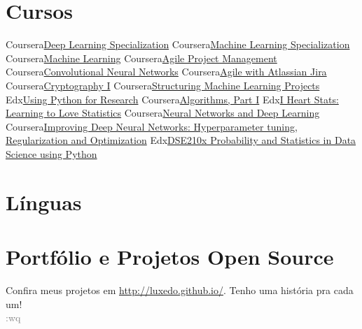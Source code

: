 \documentclass[11pt,a4paper,sans]{moderncv}        %
\begin{document}
\section{Cursos}
\cvdoubleitem
{Coursera}{\href{https://www.coursera.org/account/accomplishments/specialization/certificate/Q3RT6P3BF5XU}{Deep Learning Specialization}}
{Coursera}{\href{https://www.coursera.org/account/accomplishments/specialization/YHKBDQ77K2GB}{Machine Learning Specialization}}
\cvdoubleitem
{Coursera}{\href{https://www.coursera.org/account/accomplishments/verify/CWFKK68KQP9X}{\small{Machine Learning}}}
{Coursera}{\href{https://www.coursera.org/api/legacyCertificates.v1/spark/statementOfAccomplishment/976353~15102768/pdf}{\small{Agile Project Management}}}
\cvdoubleitem
{Coursera}{\href{https://www.coursera.org/account/accomplishments/verify/5A8K3WTQHAZF}{\small{Convolutional Neural Networks}}}
{Coursera}{\href{https://www.coursera.org/account/accomplishments/certificate/ZTZR93WKX3JV}{\small{Agile with Atlassian Jira}}}
\cvdoubleitem
{Coursera}{\href{https://www.coursera.org/api/legacyCertificates.v1/spark/statementOfAccomplishment/976353~15102768/pdf}{\small{Cryptography I}}}
{Coursera}{\href{https://www.coursera.org/account/accomplishments/verify/BBTE8KJC6WRU}{\footnotesize{Structuring Machine Learning Projects}}}
\cvdoubleitem
{Edx}{\href{https://www.edx.org/course/using-python-for-research}{\small{Using Python for Research}}}
{Coursera}{\href{https://www.coursera.org/learn/algorithms-part1}{\small{Algorithms, Part I}}}
\cvdoubleitem
{Edx}{\href{https://www.edx.org/course/i-heart-stats-learning-love-statistics-notredamex-soc120x}{\scriptsize{I Heart Stats: Learning to Love Statistics}}}
{Coursera}{\href{https://www.coursera.org/account/accomplishments/verify/RY4DLN2Q6MW3}{\footnotesize{Neural Networks and Deep Learning}}}
\cvdoubleitem
{Coursera}{\href{https://www.coursera.org/account/accomplishments/verify/6SEWP83D96QM}{\scriptsize{Improving Deep Neural Networks: Hyperparameter tuning, Regularization and Optimization}}}
{Edx}{\href{https://www.edx.org/course/probability-and-statistics-in-data-science-using-python}{\scriptsize{DSE210x Probability and Statistics in Data Science using Python}}}

\section{Línguas}


\section{Portfólio e Projetos Open Source}
Confira meus projetos em \url{http://luxedo.github.io/}. Tenho uma história pra cada um! \\
\textcolor{gray}{:wq}

\clearpage
\end{document}
